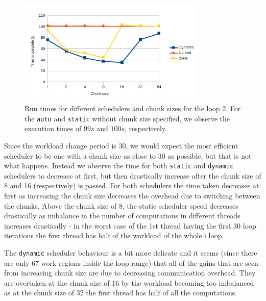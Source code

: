 \documentclass[11pt,a4paper]{article}
\begin{document}
\begin{figure}[h!]
    \begin{center}
        \includegraphics[width=0.8\textwidth]{loop2.png}
    \end{center}
    \caption{Run times for different schedulers and chunk sizes for the loop 2. For the \texttt{auto} and \texttt{static} without chunk size specified, we observe the execution times of \(99s\) and \(100s\), respectively.}
\end{figure}

Since the workload change period is 30, we would expect the most efficient scheduler to be one with a chunk size as close to 30 as possible, but that is not what happens. Instead we observe the time for both \texttt{static} and \texttt{dynamic} schedulers to decrease at first, but then drastically increase after the chunk size of 8 and 16 (respectively) is passed. For both schedulers the time taken decreases at first as increasing the chunk size decreases the overhead due to switching between the chunks. Above the chunk size of 8, the static scheduler speed decreases drastically as imbalance in the number of computations in different threads increases drastically - in the worst case of the 1st thread having the first 30 loop iterations the first thread has half of the workload of the whole i loop.

The \texttt{dynamic} scheduler behaviour is a bit more delicate and it seems (since there are only 67 work regions inside the loop range) that all of the gains that are seen from increasing chunk size are due to decreasing communication overhead. They are overtaken at the chunk size of 16 by the workload becoming too imbalanced as at the chunk size of 32 the first thread has half of all the computations.
\end{document}
